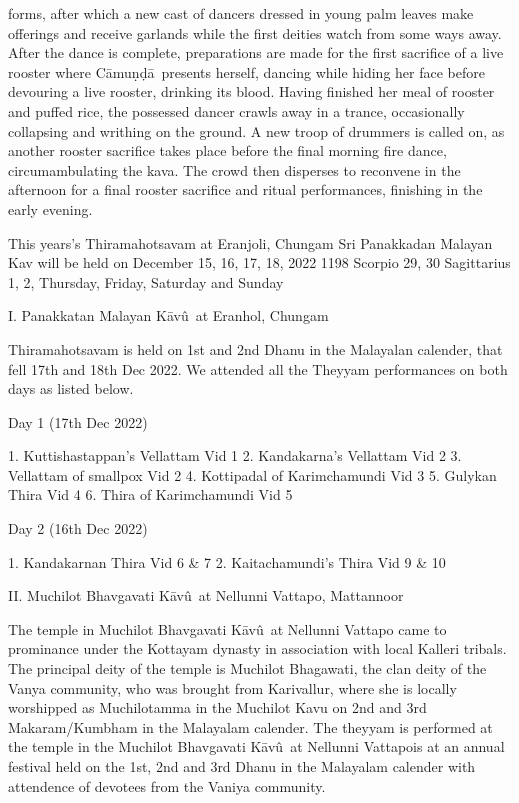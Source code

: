 \documentclass[a4paper, 11pt]{article} %
\newcommand{\camunda}[0]{C\={a}mu\d{n}\d{d}\={a}}
\newcommand{\Kavu}[0]{K\={a}v\^{u}}
\begin{document}
forms, after which a new cast of dancers dressed in young palm leaves make offerings and receive garlands while the first deities watch from some ways away.
After the dance is complete, preparations are made for the first sacrifice of a live rooster where \camunda\ presents herself, dancing while hiding her face before devouring a live rooster, drinking its blood.
Having finished her meal of rooster and puffed rice, the possessed dancer crawls away in a trance, occasionally collapsing and writhing on the ground. 
A new troop of drummers is called on, as another rooster sacrifice takes place before the final morning fire dance, circumambulating the kava.
The crowd then disperses to reconvene in the afternoon for a final rooster sacrifice and ritual performances, finishing in the early evening.

This years's Thiramahotsavam at Eranjoli, Chungam Sri Panakkadan Malayan Kav will be held on December 15, 16, 17, 18, 2022 1198 Scorpio 29, 30 Sagittarius 1, 2, Thursday, Friday, Saturday and Sunday

I. Panakkatan Malayan \Kavu\ at Eranhol, Chungam

Thiramahotsavam is held on 1st and 2nd Dhanu in the Malayalan calender, that fell 17th and 18th Dec 2022. We attended all the Theyyam performances on both days as listed below.

Day 1 (17th Dec 2022)

1. Kuttishastappan's Vellattam Vid 1
2. Kandakarna's Vellattam Vid 2
3. Vellattam of smallpox Vid 2
4. Kottipadal of Karimchamundi Vid 3
5. Gulykan Thira Vid 4
6. Thira of Karimchamundi Vid 5

Day 2 (16th Dec 2022)

1. Kandakarnan Thira Vid 6 & 7
2. Kaitachamundi's Thira Vid 9 & 10

II. Muchilot Bhavgavati \Kavu\ at Nellunni Vattapo, Mattannoor

The temple in Muchilot Bhavgavati \Kavu\ at Nellunni Vattapo came to prominance under the Kottayam dynasty in association with local Kalleri tribals. The principal deity of the temple is Muchilot Bhagawati, the clan deity of the Vanya community, who was brought from Karivallur, where she is locally worshipped as Muchilotamma in the Muchilot Kavu on 2nd and 3rd Makaram/Kumbham in the Malayalam calender. The theyyam is performed at the temple in the Muchilot Bhavgavati \Kavu\ at Nellunni Vattapois at an annual festival held on the 1st, 2nd and 3rd Dhanu in the Malayalam calender with attendence of devotees from the Vaniya community.
\end{document}
